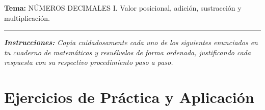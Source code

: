\documentclass[12pt, letterpaper]{article}
\begin{document}
	\vspace{0.2cm}
	\noindent \textbf{Tema:} NÚMEROS DECIMALES I. Valor posicional, adición, sustracción y multiplicación.
	\vspace{0.2cm}
	\hrule
	\vspace{0.4cm}
	
	\noindent \textit{\textbf{Instrucciones:} Copia cuidadosamente cada uno de los siguientes enunciados en tu cuaderno de matemáticas y resuélvelos de forma ordenada, justificando cada respuesta con su respectivo procedimiento paso a paso.}
	\vspace{0.6cm}
	
	\section*{Ejercicios de Práctica y Aplicación}
	
\end{document}
